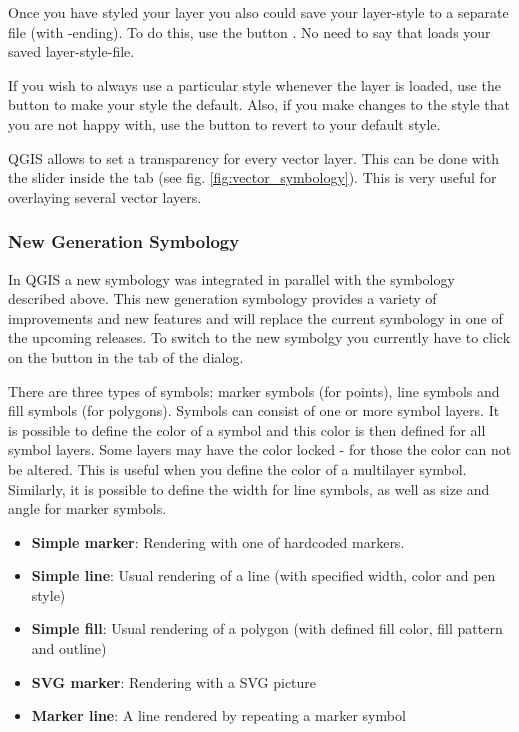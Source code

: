Once you have styled your layer you also could save your layer-style to a
separate file (with -ending).
To do this, use the button . No need to say that
 loads your saved layer-style-file.

If you wish to always use a particular style whenever the layer is loaded, 
use the  button to make your style the default. Also, 
if you make changes to the style that you are not happy with, use the  button to revert to your default style.

 \label{sec:vect_transparency} 
QGIS allows to set a transparency for every vector layer. This can be done with
the slider  inside the  tab (see
fig. \ref{fig:vector_symbology}). This is very useful for overlaying several
vector layers.

\subsubsection{New Generation Symbology}

In QGIS \CURRENT a new symbology was integrated in parallel with the symbology 
described above. This new generation symbology provides a variety of improvements and 
new features and will replace the current symbology in one of the upcoming releases. 
To switch to the new symbolgy you currently have to click on the  button in the  tab of the  dialog.  


There are three types of symbols: marker symbols (for points), line symbols and 
fill symbols (for polygons). Symbols can consist of one or more symbol layers. It 
is possible to define the color of a symbol and this color is then defined for all 
symbol layers. Some layers may have the color locked - for those the color can not 
be altered. This is useful when you define the color of a multilayer symbol. 
Similarly, it is possible to define the width for line symbols, as well as size and 
angle for marker symbols.


\begin{itemize}
\item \textbf{Simple marker}: Rendering with one of hardcoded markers.
\item \textbf{Simple line}: Usual rendering of a line (with specified 
width, color and pen style) 
\item \textbf{Simple fill}: Usual rendering of a polygon (with defined 
fill color, fill pattern and outline) 
\item \textbf{SVG marker}: Rendering with a SVG picture 
\item \textbf{Marker line}: A line rendered by repeating a marker symbol 
\end{itemize}

